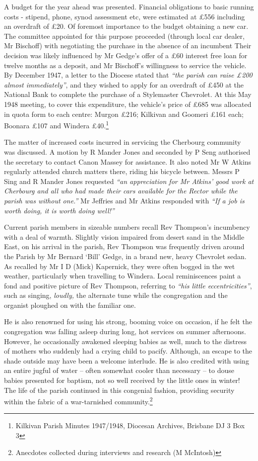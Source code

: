 A budget for the year ahead was presented. Financial obligations to basic running costs - stipend, phone, synod assessment etc, were estimated at £556 including an overdraft of £20. Of foremost importance to the budget obtaining a new car. The committee appointed for this purpose proceeded (through local car dealer, Mr Bischoff) with negotiating the purchase in the absence of an incumbent Their decision was likely influenced by Mr Gedge's offer of a £60 interest free loan for twelve months as a deposit, and Mr Bischoff's willingness to service the vehicle. By December 1947, a letter to the Diocese stated that \emph{``the parish can raise £200 almost immediately''}, and they wished to apply for an overdraft of £450 at the National Bank to complete the purchase of a Stylemaster Chevrolet. At this May 1948 meeting, to cover this expenditure, the vehicle's price of £685 was allocated in quota form to each centre: Murgon £216; Kilkivan and Goomeri £161 each; Boonara £107 and Windera £40.\footnote{Kilkivan Parish Minutes 1947/1948, Diocesan Archives, Brisbane DJ 3 Box 3}

The matter of increased costs incurred in servicing the Cherbourg community was discussed. A motion by R Mander Jones and seconded by P Seng authorised the secretary to contact Canon Massey for assistance. It also noted Mr W Atkins regularly attended church matters there, riding his bicycle between. Messrs P Sing and R Mander Jones requested \emph{``an appreciation for Mr Atkins' good work at Cherbourg and all who had made their cars available for the Rector while the parish was without one.''} Mr Jeffries and Mr Atkins responded with \emph{``If a job is worth doing, it is worth doing well!''}

Current parish members in sizeable numbers recall Rev Thompson's incumbency with a deal of warmth. Slightly vision impaired from desert sand in the Middle East, on his arrival in the parish, Rev Thompson was frequently driven around the Parish by Mr Bernard `Bill' Gedge, in a brand new, heavy Chevrolet sedan. As recalled by Mr I D (Mick) Kapernick, they were often bogged in the wet weather, particularly when travelling to Windera. Local reminiscences paint a fond and positive picture of Rev Thompson, referring to \emph{``his little eccentricities''}, such as singing, \emph{loudly,} the alternate tune while the congregation and the organist ploughed on with the familiar one.

He is also renowned for using his strong, booming voice on occasion, if he felt the congregation was falling asleep during long, hot services on summer afternoons. However, he occasionally awakened sleeping babies as well, much to the distress of mothers who suddenly had a crying child to pacify. Although, an escape to the shade outside may have been a welcome interlude. He is also credited with using an entire jugful of water -- often somewhat cooler than necessary -- to douse babies presented for baptism, not so well received by the little ones in winter! The life of the parish continued in this congenial fashion, providing security within the fabric of a war-tarnished community.\footnote{Anecdotes collected during interviews and research (M McIntosh)}

